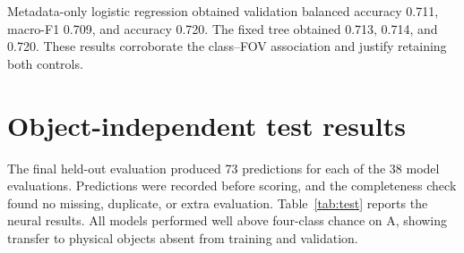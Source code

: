 \documentclass[preprint,12pt,authoryear]{elsarticle}
\newcommand{\balacc}{balanced accuracy}
\newcommand{\macrof}{macro-F1}
\begin{document}
Metadata-only logistic regression obtained validation \balacc{} 0.711, \macrof{}
0.709, and accuracy 0.720. The fixed tree obtained 0.713, 0.714, and 0.720. These
results corroborate the class--FOV association and justify retaining both controls.

\section{Object-independent test results}
\label{sec:testresults}

The final held-out evaluation produced 73 predictions for each of the 38 model
evaluations. Predictions were recorded before scoring, and the completeness check
found no missing, duplicate, or extra evaluation. Table~\ref{tab:test} reports the
neural results. All models performed well above four-class chance on A, showing
transfer to physical objects absent from training and validation.
\end{document}
